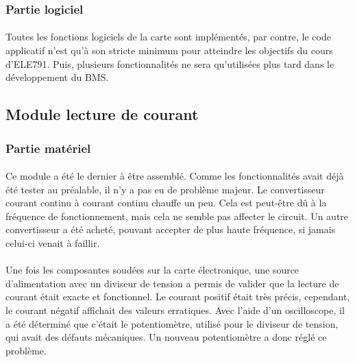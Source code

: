 		\subsubsection{Partie logiciel}	
		
			\paragraph{}
		
			Toutes les fonctions logiciels de la carte sont implémentés, par contre, le code applicatif n’est qu’à son stricte minimum pour atteindre les objectifs du cours d’ELE791. Puis, plusieurs fonctionnalités ne sera qu’utilisées plus tard dans le développement du BMS.


			
					
	\subsection{Module lecture de courant}

		\subsubsection{Partie matériel}	
				
			\paragraph{}
			Ce module a été le dernier à être assemblé. Comme les fonctionnalités avait déjà été tester au préalable, il n’y a pas eu de problème majeur. Le convertisseur courant continu à courant continu chauffe un peu. Cela est peut-être dû à la fréquence de fonctionnement, mais cela ne semble pas affecter le circuit. Un autre convertisseur a été acheté, pouvant accepter de plus haute fréquence, si jamais celui-ci venait à faillir.
		
			\paragraph{}
			Une fois les composantes soudées sur la carte électronique, une source d’alimentation avec un diviseur de tension a permis de valider que la lecture de courant était exacte et fonctionnel. Le courant positif était très précis, cependant, le courant négatif affichait des valeurs erratiques. Avec l'aide d'un oscilloscope, il a été déterminé que c’était le potentiomètre, utilisé pour le diviseur de tension, qui avait des défauts mécaniques. Un nouveau potentiomètre a donc réglé ce problème.
		
